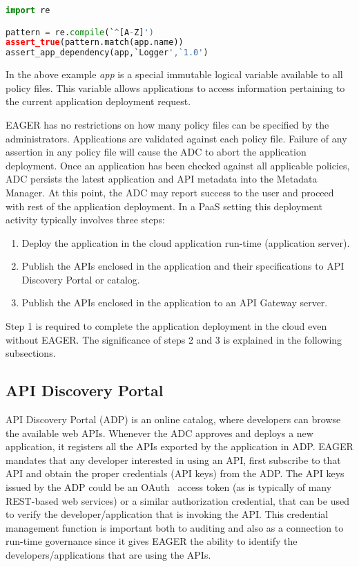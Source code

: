 {\footnotesize
\begin{lstlisting}[language=Python, frame=single]
import re

pattern = re.compile(`^[A-Z]')
assert_true(pattern.match(app.name))
assert_app_dependency(app,`Logger',`1.0')
\end{lstlisting}
}

In the above example \textit{app} is a special immutable logical variable available to
all policy files. This variable allows applications to access information
pertaining to the current application deployment request. 

EAGER has no restrictions on how many policy files can be specified by the
administrators. Applications are validated against each policy file. Failure
of any assertion in any policy file will cause the ADC to abort the
application deployment. Once an application has been checked against all
applicable policies, ADC persists the latest application and API metadata into
the Metadata Manager.  At this point, the ADC may report success to the user
and proceed with rest of the application deployment. In a PaaS setting
this deployment
activity typically involves three
steps:

\begin{enumerate}
\item Deploy the application in the cloud application run-time (application server).
\item Publish the APIs enclosed in the application and their specifications to
API Discovery Portal or catalog.
\item Publish the APIs enclosed in the application to an API Gateway server.
\end{enumerate}

Step 1 is required to complete the application deployment in the cloud even without EAGER. The significance of steps 2 and 3 is explained in the 
following subsections.

\subsection{API Discovery Portal} API Discovery Portal (ADP) is an online
catalog, where developers can browse the available web APIs. Whenever the ADC
approves and deploys a new application, it registers all the APIs exported by
the application in ADP.  EAGER mandates that any developer interested in using
an API, first subscribe to that API and obtain the proper credentials (API
keys) from the ADP. The API keys issued by the ADP could be an
OAuth~\cite{oauth2} access
token (as is typically of many REST-based web services) 
or a similar authorization credential, that can be used to verify the
developer/application that is invoking the API. This credential management
function is
important both to auditing and also as a connection to
run-time governance since it gives EAGER the ability to identify
the developers/applications that are using the APIs. 

